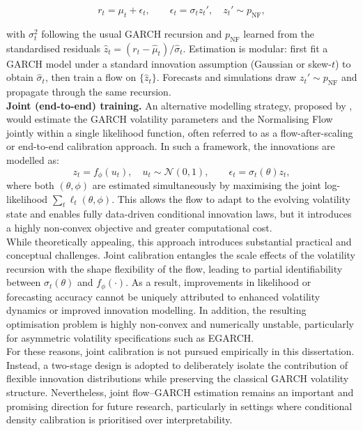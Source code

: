 \documentclass[oneside,12pt]{CUEDthesisPSnPDF}
\newcommand{\textcite}{\citet}
\begin{document}
\[
r_t=\mu_t+\epsilon_t,\qquad \epsilon_t=\sigma_t z_t', \quad z_t' \sim p_{\text{NF}},
\]

with $\sigma_t^2$ following the usual GARCH recursion and $p_{\text{NF}}$ learned from the standardised residuals $\hat z_t=(r_t-\hat\mu_t)/\hat\sigma_t$. Estimation is modular: first fit a GARCH model under a standard innovation assumption (Gaussian or skew-$t$) to obtain 
$\hat\sigma_t$, then train a flow on $\{\hat z_t\}$. 
Forecasts and simulations draw $z_t' \sim p_{\text{NF}}$ 
and propagate through the same recursion.\\

\medskip
\noindent
\textbf{Joint (end-to-end) training.} 
An alternative modelling strategy, proposed by \textcite{seitz2022garchnf}, would estimate the GARCH volatility parameters and the Normalising Flow jointly within a single likelihood function, often referred to as a flow-after-scaling or end-to-end calibration approach. In such a framework, the innovations are modelled as:
\[
z_t = f_\phi(u_t), \quad u_t \sim \mathcal{N}(0,1), \qquad 
\epsilon_t = \sigma_t(\theta) z_t,
\]
where both $(\theta, \phi)$ are estimated simultaneously by maximising 
the joint log-likelihood 
$\sum_t \ell_t(\theta, \phi)$. 
This allows the flow to adapt to the evolving volatility state 
and enables fully data-driven conditional innovation laws, 
but it introduces a highly non-convex objective and greater computational cost.\\

While theoretically appealing, this approach introduces substantial practical and conceptual challenges. Joint calibration entangles the scale effects of the volatility recursion with the shape flexibility of the flow, leading to partial identifiability between $\sigma_t(\theta)$ and $f_\phi(\cdot)$. As a result, improvements in likelihood or forecasting accuracy cannot be uniquely attributed to enhanced volatility dynamics or improved innovation modelling. In addition, the resulting optimisation problem is highly non-convex and numerically unstable, particularly for asymmetric volatility specifications such as EGARCH.\\

For these reasons, joint calibration is not pursued empirically in this dissertation. Instead, a two-stage design is adopted to deliberately isolate the contribution of flexible innovation distributions while preserving the classical GARCH volatility structure. Nevertheless, joint flow--GARCH estimation remains an important and promising direction for future research, particularly in settings where conditional density calibration is prioritised over interpretability.\\
\end{document}
